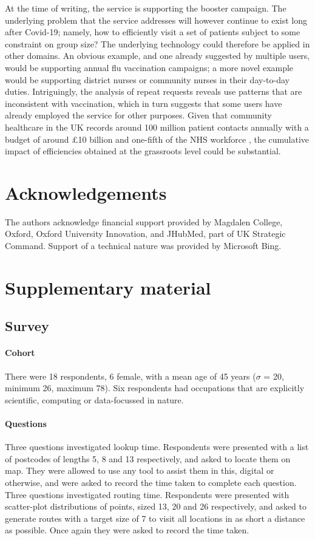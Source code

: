 \documentclass[review]{elsarticle}
\begin{document}
At the time of writing, the service is supporting the booster campaign. The underlying problem that the service addresses will however continue to exist long after Covid-19; namely, how to efficiently visit a set of patients subject to some constraint on group size? The underlying technology could therefore be applied in other domains. An obvious example, and one already suggested by multiple users, would be supporting annual flu vaccination campaigns; a more novel example would be supporting district nurses or community nurses in their day-to-day duties. Intriguingly, the analysis of repeat requests reveals use patterns that are inconsistent with vaccination, which in turn suggests that some users have already employed the service for other purposes. Given that community healthcare in the UK records around 100 million patient contacts annually with a budget of around £10 billion and one-fifth of the NHS workforce \cite{Fund2019}, the cumulative impact of efficiencies obtained at the grassroots level could be substantial. 

\section{Acknowledgements}

The authors acknowledge financial support provided by Magdalen College, Oxford, Oxford University Innovation, and JHubMed, part of UK Strategic Command. Support of a technical nature was provided by Microsoft Bing. 

\section{Supplementary material}

\subsection{Survey}

\paragraph{Cohort} There were 18 respondents, 6 female, with a mean age of 45 years ($\sigma$ = 20, minimum 26, maximum 78). Six respondents had occupations that are explicitly scientific, computing or data-focussed in nature. 

\paragraph{Questions} Three questions investigated lookup time. Respondents were presented with a list of postcodes of lengths 5, 8 and 13 respectively, and asked to locate them on map. They were allowed to use any tool to assist them in this, digital or otherwise, and were asked to record the time taken to complete each question. Three questions investigated routing time. Respondents were presented with scatter-plot distributions of points, sized 13, 20 and 26 respectively, and asked to generate routes with a target size of 7 to visit all locations in as short a distance as possible. Once again they were asked to record the time taken.
\end{document}
